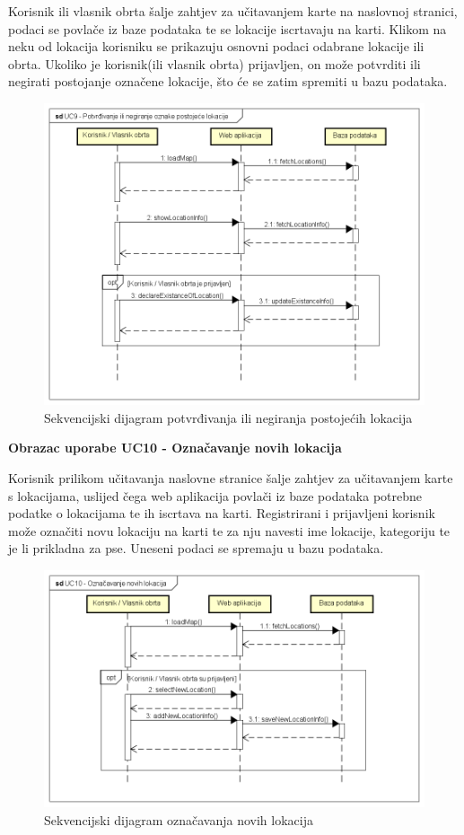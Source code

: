 			Korisnik ili vlasnik obrta šalje zahtjev za učitavanjem karte na naslovnoj stranici, podaci se povlače iz baze podataka te se lokacije iscrtavaju na karti. Klikom na neku od lokacija korisniku se prikazuju osnovni podaci odabrane lokacije ili obrta. Ukoliko je korisnik(ili vlasnik obrta) prijavljen, on može potvrditi ili negirati postojanje označene lokacije, što će se zatim spremiti u bazu podataka.
			\begin{figure}[H]
				\centering
				\includegraphics[width=\textwidth]{img/UC9-Potvrdivanje_ili_negiranje_oznake_postojece_lokacije.png}
				\caption{Sekvencijski dijagram potvrđivanja ili negiranja postojećih lokacija}
			\end{figure}
			
			\pagebreak \noindent \textbf{Obrazac uporabe UC10 - Označavanje novih lokacija}
			
			Korisnik prilikom učitavanja naslovne stranice šalje zahtjev za učitavanjem karte s lokacijama, uslijed čega web aplikacija povlači iz baze podataka potrebne podatke o lokacijama te ih iscrtava na karti. Registrirani i prijavljeni korisnik može označiti novu lokaciju na karti te za nju navesti ime lokacije, kategoriju te je li prikladna za pse. Uneseni podaci se spremaju u bazu podataka.
			\begin{figure}[H]
				\centering
				\includegraphics[width=\textwidth]{img/UC10-Oznacavanje_novih_lokacija.png}
				\caption{Sekvencijski dijagram označavanja novih lokacija}
			\end{figure}
			
